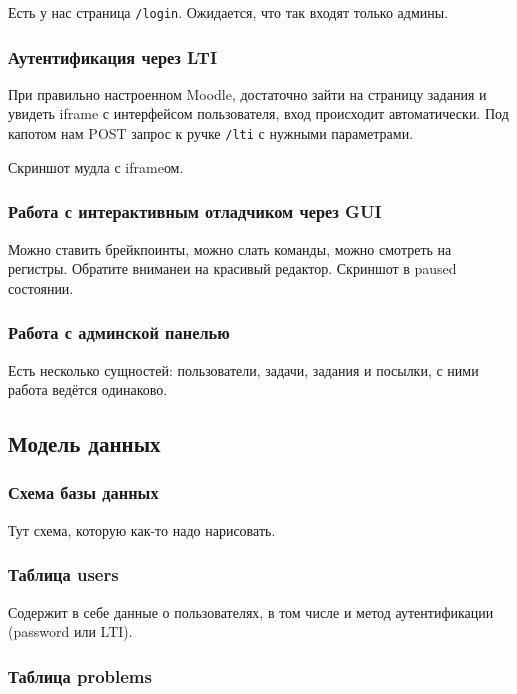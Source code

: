 \documentclass[a4paper,article,14pt]{extarticle}
\begin{document}
Есть у нас страница \texttt{/login}. Ожидается, что так входят только админы.

\subsubsection{Аутентификация через LTI}

При правильно настроенном Moodle, достаточно зайти на страницу задания и увидеть iframe с интерфейсом пользователя, вход происходит автоматически. Под капотом нам POST запрос к ручке \texttt{/lti} с нужными параметрами.

Скриншот мудла с iframeом.

\subsubsection{Работа с интерактивным отладчиком через GUI}

Можно ставить брейкпоинты, можно слать команды, можно смотреть на регистры. Обратите вниманеи на красивый редактор. Скриншот в paused состоянии.

\subsubsection{Работа с админской панелью}

Есть несколько сущностей: пользователи, задачи, задания и посылки, с ними работа ведётся одинаково.

\subsection{Модель данных}

\subsubsection{Схема базы данных}

Тут схема, которую как-то надо нарисовать.

\subsubsection{Таблица users}

Содержит в себе данные о пользователях, в том числе и метод аутентификации (password или LTI).

\subsubsection{Таблица problems}
\end{document}
